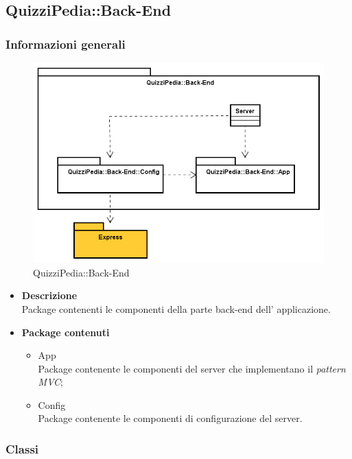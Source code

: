 \subsection{QuizziPedia::Back-End}
\subsubsection{Informazioni generali}
\label{QuizziPedia::Back-End}
\begin{figure}
	\centering
	\includegraphics[scale=0.45]{UML/Package/QuizziPedia_Back-End.png}
	\caption{QuizziPedia::Back-End}
\end{figure}

	\begin{itemize}
		\item \textbf{Descrizione} \\ Package contenenti le componenti della parte back-end dell' applicazione.
		\item \textbf{Package contenuti}
		\begin{itemize}
			\item App \\
			Package contenente le componenti del server che implementano il \textit{pattern MVC};
			\item Config \\
			Package contenente le componenti di configurazione del server.
		\end{itemize}
	\end{itemize}
\subsubsection{Classi}
